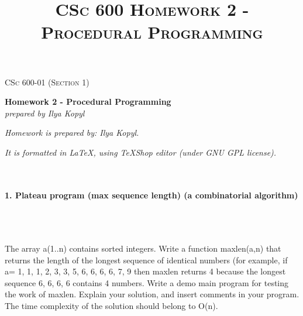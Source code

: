 \documentclass{article}
\begin{document}
	\setlength{\grammarparsep}{5pt plus 1pt minus 1pt} %
	\setlength{\grammarindent}{13em} %




	\begin{titlepage}
		\begin{center}
				\Large\textsc{CSc 600-01 (Section 1)}
				
				\Large\textbf{Homework 2 - Procedural Programming}\\

				\Large\textit{prepared by Ilya Kopyl}
				
		\end{center}	
	\end{titlepage}


	\title{\textsc{CSc 600 Homework 2 - Procedural Programming}}	
	\maketitle
	
		\textit{Homework is prepared by: Ilya Kopyl.}

		\textit{It is formatted in LaTeX, using TeXShop editor (under GNU GPL license).}
		


	\rmfamily\




	\paragraph{1. Plateau program (max sequence length) (a combinatorial algorithm)}\
	\rmfamily\\\
	
		The array a(1..n) contains sorted integers. Write a function maxlen(a,n) that returns the length of the longest sequence of identical numbers (for example, if a={ 1, 1, 1, 2, 3, 3, 5, 6, 6, 6, 6, 7, 9 } then maxlen returns 4 because the longest sequence 6, 6, 6, 6 contains 4 numbers. Write a demo main program for testing the work of maxlen. Explain your solution, and insert comments in your program. The time complexity of the solution should belong to O(n).
\end{document}
